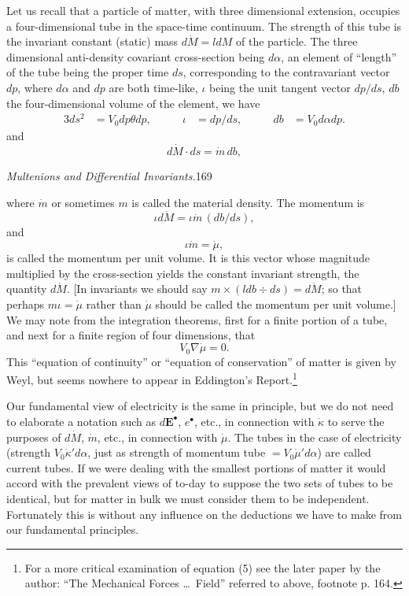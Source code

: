\documentclass[11pt]{article}
\begin{document}
\indent Let us recall that a particle of matter, with three dimensional extension, occupies a four-dimensional tube in the space-time continuum. The strength of this tube is the invariant constant (static) mass $d\dot M=ldM$ of the particle. The three dimensional anti-density covariant cross-section being $d\alpha$, an element of ``length'' of the tube being the proper time $ds$, corresponding to the contravariant vector $dp$, where $d\alpha$ and $dp$ are both time-like, $\iota$ being the unit tangent vector $dp/ds$, $db$ the four-dimensional volume of the element, we have
\begin{alignat}{3}
  ds^2&=V_0dp\theta dp, &\qquad \iota&=dp/ds, &\qquad db&=V_0d\alpha dp. \tag{1}
\end{alignat}
and
\begin{equation}
  d\dot M\mathbin{\cdot}ds=\dot m\,db,
  \tag{2}
\end{equation}

\newpage\thispagestyle{empty}\begin{center}\textit{Multenions and Differential Invariants.}\hfill 169\end{center}
where $\dot m$ or sometimes $m$ is called the material density. The momentum is
\begin{equation}
  \iota d\dot M=\iota\dot m\,(db/ds),
  \tag{3}
\end{equation}
and
\begin{equation}
  \iota\dot m=\dot\mu,
  \tag{4}
\end{equation}
is called the momentum per unit volume. It is this vector whose magnitude multiplied by the cross-section yields the constant invariant strength, the quantity $d\dot M$. [In invariants we should say $m\times(ldb\div ds)=d\dot M$; so that perhaps $m\iota=\dot\mu$ rather than $\dot\mu$ should be called the momentum per unit volume.] We may note from the integration theorems, first for a finite portion of a tube, and next for a finite region of four dimensions, that
\begin{equation}
  V_0\nabla\dot\mu=0.
  \tag{5}
\end{equation}
This ``equation of continuity'' or ``equation of conservation'' of matter is given by Weyl, but seems nowhere to appear in Eddington's Report.\footnote{For a more critical examination of equation (5) see the later paper by the author: ``The Mechanical Forces \ldots\ Field'' referred to above, footnote p. 164.}

\indent Our fundamental view of electricity is the same in principle, but we do not need to elaborate a notation such as $d\mathbf{E}^\bullet$, $e^\bullet$, etc., in connection with $\dot\kappa$ to serve the purposes of $d\dot M$, $\dot m$, etc., in connection with $\dot\mu$. The tubes in the case of electricity (strength $V_0\dot\kappa' d\alpha$, just as strength of momentum tube $=V_0\dot\mu' d\alpha$) are called current tubes. If we were dealing with the smallest portions of matter it would accord with the prevalent views of to-day to suppose the two sets of tubes to be identical, but for matter in bulk we must consider them to be independent. Fortunately this is without any influence on the deductions we have to make from our fundamental principles.
\end{document}
